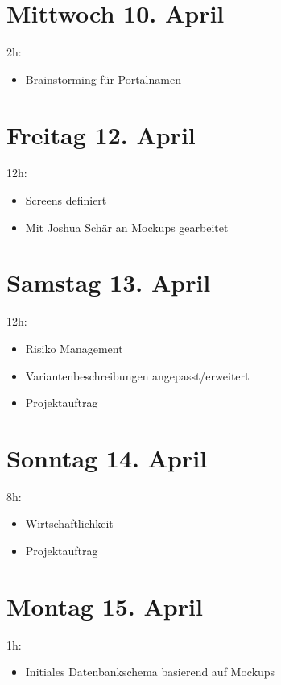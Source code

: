 \section{Mittwoch 10. April}\label{mittwoch-10.april}

2h:

\begin{itemize}
  \tightlist
  \item
        Brainstorming für Portalnamen
\end{itemize}

\section{Freitag 12. April}\label{freitag-12.april}

12h:

\begin{itemize}
  \tightlist
  \item
        Screens definiert
  \item
        Mit Joshua Schär an Mockups gearbeitet
\end{itemize}

\section{Samstag 13. April}\label{samstag-13.april}

12h:

\begin{itemize}
  \tightlist
  \item
        Risiko Management
  \item
        Variantenbeschreibungen angepasst/erweitert
  \item
        Projektauftrag
\end{itemize}

\section{Sonntag 14. April}\label{sonntag-14.april}

8h:

\begin{itemize}
  \tightlist
  \item
        Wirtschaftlichkeit
  \item
        Projektauftrag
\end{itemize}

\section{Montag 15. April}\label{montag-15.april}

1h:

\begin{itemize}
  \tightlist
  \item
        Initiales Datenbankschema basierend auf Mockups
\end{itemize}
